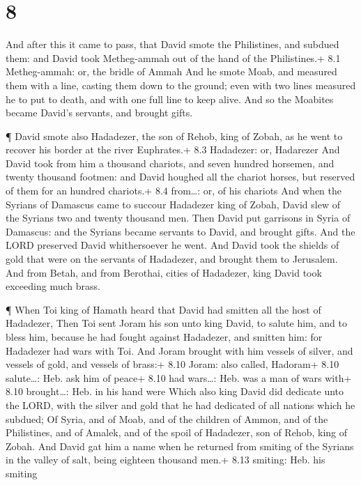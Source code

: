 \hypertarget{section-7}{%
\section{8}\label{section-7}}

 And after this it came to pass, that David smote the
Philistines, and subdued them: and David took Metheg-ammah out of the
hand of the Philistines.+ 8.1 Metheg-ammah: or, the bridle of Ammah
 And he smote Moab, and measured them with a line, casting
them down to the ground; even with two lines measured he to put to
death, and with one full line to keep alive. And so the Moabites became
David's servants, and brought gifts.

 ¶ David smote also Hadadezer, the son of Rehob, king of
Zobah, as he went to recover his border at the river Euphrates.+ 8.3
Hadadezer: or, Hadarezer  And David took from him a thousand
chariots, and seven hundred horsemen, and twenty thousand footmen: and
David houghed all the chariot horses, but reserved of them for an
hundred chariots.+ 8.4 from\ldots: or, of his chariots  And
when the Syrians of Damascus came to succour Hadadezer king of Zobah,
David slew of the Syrians two and twenty thousand men.  Then
David put garrisons in Syria of Damascus: and the Syrians became
servants to David, and brought gifts. And the LORD preserved David
whithersoever he went.  And David took the shields of gold
that were on the servants of Hadadezer, and brought them to Jerusalem.
 And from Betah, and from Berothai, cities of Hadadezer,
king David took exceeding much brass.

 ¶ When Toi king of Hamath heard that David had smitten all
the host of Hadadezer,  Then Toi sent Joram his son unto
king David, to salute him, and to bless him, because he had fought
against Hadadezer, and smitten him: for Hadadezer had wars with Toi. And
Joram brought with him vessels of silver, and vessels of gold, and
vessels of brass:+ 8.10 Joram: also called, Hadoram+ 8.10 salute\ldots:
Heb. ask him of peace+ 8.10 had wars\ldots: Heb. was a man of wars with+
8.10 brought\ldots: Heb. in his hand were  Which also king
David did dedicate unto the LORD, with the silver and gold that he had
dedicated of all nations which he subdued;  Of Syria, and
of Moab, and of the children of Ammon, and of the Philistines, and of
Amalek, and of the spoil of Hadadezer, son of Rehob, king of Zobah.
 And David gat him a name when he returned from smiting of
the Syrians in the valley of salt, being eighteen thousand men.+ 8.13
smiting: Heb. his smiting

